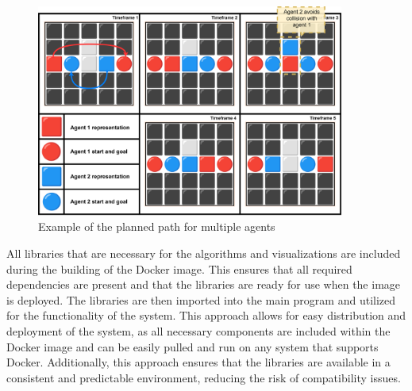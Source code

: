 \begin{figure}[H]
    \centering
    \includegraphics[width=0.9\textwidth]{pictures/example_planning.png}
    \caption{ Example of the planned path for multiple agents } 
    \label{fig:multiple_agent_path}
\end{figure}

All libraries that are necessary for the algorithms and visualizations are included during the building of the Docker image. This ensures that all required dependencies are present and that the libraries are ready for use when the image is deployed. The libraries are then imported into the main program and utilized for the functionality of the system. This approach allows for easy distribution and deployment of the system, as all necessary components are included within the Docker image and can be easily pulled and run on any system that supports Docker. Additionally, this approach ensures that the libraries are available in a consistent and predictable environment, reducing the risk of compatibility issues.